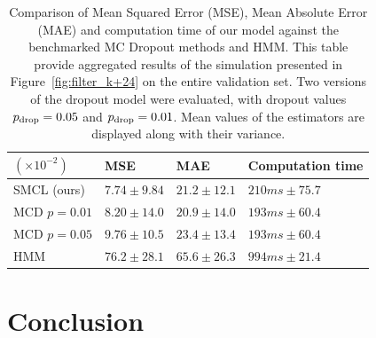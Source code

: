 \documentclass[journal]{IEEEtran}
\begin{document}
\begin{table}[htpb]
	\centering
	\caption{Comparison of Mean Squared Error (MSE), Mean Absolute Error (MAE) and computation time of our model against the benchmarked MC Dropout methods and HMM.
		This table provide aggregated results of the simulation presented in Figure~\ref{fig:filter_k+24} on the entire validation set.
		Two versions of the dropout model were evaluated, with dropout values $p_\textnormal{drop}=0.05$ and $p_\textnormal{drop}=0.01$.
		Mean values of the estimators are displayed along with their variance.}
	\label{tab:ci_comparison}
	\begin{tabular}{llll}
		\toprule
		$(\times 10^{-2})$ & MSE             & MAE             & Computation time  \\
		\toprule
		SMCL (ours)        & $7.74 \pm 9.84$ & $21.2 \pm 12.1$ & $210 ms \pm 75.7$ \\
		MCD $p=0.01$       & $8.20 \pm 14.0$ & $20.9 \pm 14.0$ & $193 ms \pm 60.4$ \\
		MCD $p=0.05$       & $9.76 \pm 10.5$ & $23.4 \pm 13.4$ & $193 ms \pm 60.4$ \\
		HMM                & $76.2 \pm 28.1$ & $65.6 \pm 26.3$ & $994 ms \pm 21.4$ \\
		\bottomrule
	\end{tabular}
\end{table}


\section{Conclusion}%
\label{sec:conclusion}
\end{document}
